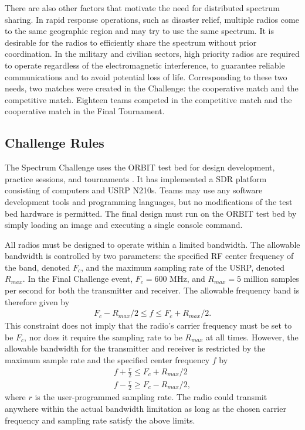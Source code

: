 There are also other factors that motivate the need for distributed spectrum sharing. In rapid response operations, such as disaster relief, multiple radios come to the same geographic region and may try to use the same spectrum. It is desirable for the radios to efficiently share the spectrum without prior coordination. In the military and civilian sectors, high priority radios are required to operate regardless of the electromagnetic interference, to guarantee reliable communications and to avoid potential loss of life. Corresponding to these two needs, two matches were created in the Challenge: the cooperative match and the competitive match. Eighteen teams competed in the competitive match and the cooperative match in the Final Tournament.

\subsection{Challenge Rules}

The Spectrum Challenge uses the ORBIT test bed for design development, practice sessions, and tournaments \cite{OrbitLab}. It has implemented a SDR platform consisting of computers and USRP N210s. Teams may use any software development tools and programming languages, but no modifications of the test bed hardware is permitted. The final design must run on the ORBIT test bed by simply loading an image and executing a single console command.

All radios must be designed to operate within a limited bandwidth. The allowable bandwidth is controlled by two parameters: the specified RF center frequency of the band, denoted $F_c$, and the maximum sampling rate of the USRP, denoted $R_{max}$. In the Final Challenge event, $F_c=600$ MHz, and $R_{max}=5$ million samples per second for both the transmitter and receiver. The allowable frequency band is therefore given by
\begin{align}
F_c - R_{max}/2 \le f \le F_c + R_{max}/2.
\end{align}
This constraint does not imply that the radio's carrier frequency must be set to be $F_c$, nor does it require the sampling rate to be $R_{max}$ at all times. However, the allowable bandwidth for the transmitter and receiver is restricted by the maximum sample rate and the specified center frequency $f$ by
\begin{align}
&f+\frac{r}{2} \le F_c + R_{max}/2&\\
&f-\frac{r}{2} \ge F_c - R_{max}/2,&
\end{align}
where $r$ is the user-programmed sampling rate. The radio could transmit anywhere within the actual bandwidth limitation as long as the chosen carrier frequency and sampling rate satisfy the above limits.

